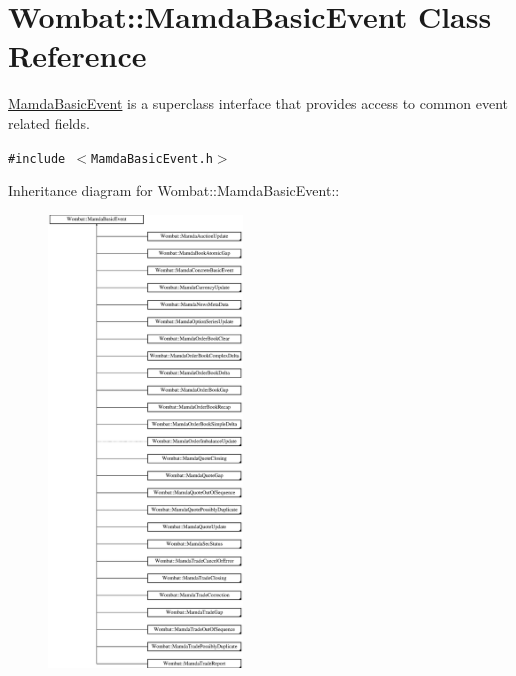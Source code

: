 \hypertarget{classWombat_1_1MamdaBasicEvent}{
\section{Wombat::Mamda\-Basic\-Event Class Reference}
\label{classWombat_1_1MamdaBasicEvent}
}
\hyperlink{classWombat_1_1MamdaBasicEvent}{Mamda\-Basic\-Event} is a superclass interface that provides access to common event related fields.  


{\tt \#include $<$Mamda\-Basic\-Event.h$>$}

Inheritance diagram for Wombat::Mamda\-Basic\-Event::\begin{figure}[H]
\begin{center}
\leavevmode
\includegraphics[height=12cm]{classWombat_1_1MamdaBasicEvent}
\end{center}
\end{figure}
